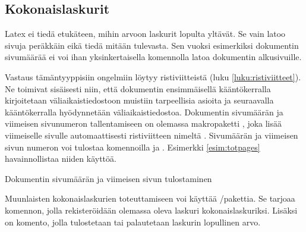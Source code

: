 \subsection{Kokonaislaskurit}

Latex ei tiedä etukäteen, mihin arvoon laskurit lopulta yltävät. Se vain
latoo sivuja peräkkäin eikä tiedä mitään tulevasta. Sen vuoksi
esimerkiksi dokumentin sivumäärää ei voi ihan yksinkertaisella
komennolla latoa dokumentin alkusivuille.

Vastaus tämäntyyppisiin ongelmiin löytyy ristiviitteistä (luku
\ref{luku:ristiviitteet}). Ne toimivat sisäisesti niin, että dokumentin
ensimmäisellä kääntökerralla kirjoitetaan väliaikaistiedostoon muistiin
tarpeellisia asioita ja seuraavalla kääntökerralla hyödynnetään
väliaikaistiedostoa. Dokumentin sivumäärän ja viimeisen sivunumeron
tallentamiseen on olemassa makropaketti
, joka lisää viimeiselle sivulle
automaattisesti ristiviitteen nimeltä . Sivumäärän ja
viimeisen sivun numeron voi tulostaa komennoilla  ja
. Esimerkki \ref{esim:totpages} havainnollistaa
niiden käyttöä.

\begin{esimerkki*}
\caption{Dokumentin sivumäärän ja viimeisen sivun tulostaminen}
\label{esim:totpages}
\end{esimerkki*}

Muunlaisten kokonaislaskurien toteuttamiseen voi käyttää
\-/pakettia. Se tarjoaa komennon,
jolla rekisteröidään olemassa oleva laskuri kokonaislaskuriksi. Lisäksi
on komento, jolla tulostetaan tai palautetaan laskurin lopullinen arvo.

\begin{koodilohkosis}
  \addtocounter{oma}{1} %
\end{koodilohkosis}

